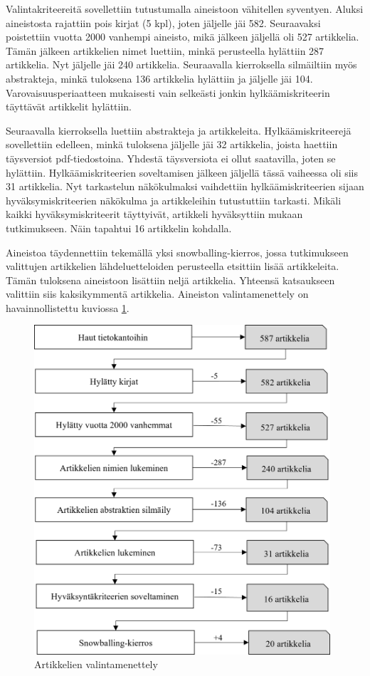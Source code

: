 \documentclass[utf8]{gradu3}
\begin{document}
Valintakriteereitä sovellettiin tutustumalla aineistoon vähitellen syventyen. Aluksi  aineistosta rajattiin pois kirjat (5 kpl), joten jäljelle jäi 582. Seuraavaksi poistettiin vuotta 2000 vanhempi aineisto, mikä jälkeen jäljellä oli 527 artikkelia. Tämän jälkeen artikkelien nimet luettiin, minkä perusteella hylättiin 287 artikkelia. Nyt jäljelle jäi 240 artikkelia. Seuraavalla kierroksella silmäiltiin myös abstrakteja, minkä tuloksena 136 artikkelia hylättiin ja jäljelle jäi 104. Varovaisuusperiaatteen mukaisesti vain selkeästi jonkin hylkäämiskriteerin täyttävät artikkelit hylättiin.

Seuraavalla kierroksella luettiin abstrakteja ja artikkeleita. Hylkäämiskriteerejä sovellettiin edelleen, minkä tuloksena jäljelle jäi 32 artikkelia, joista haettiin täysversiot pdf-tiedostoina. Yhdestä täysversiota ei ollut saatavilla, joten se hylättiin. Hylkäämiskriteerien soveltamisen jälkeen jäljellä tässä vaiheessa oli siis 31 artikkelia. Nyt tarkastelun näkökulmaksi vaihdettiin hylkäämiskriteerien sijaan hyväksymiskriteerien näkökulma ja artikkeleihin tutustuttiin tarkasti. Mikäli kaikki hyväksymiskriteerit täyttyivät, artikkeli hyväksyttiin mukaan tutkimukseen. Näin tapahtui 16 artikkelin kohdalla.

Aineistoa täydennettiin tekemällä yksi snowballing-kierros, jossa tutkimukseen valittujen artikkelien lähdeluetteloiden perusteella etsittiin lisää artikkeleita. Tämän tuloksena aineistoon lisättiin neljä artikkelia. Yhteensä katsaukseen valittiin siis kaksikymmentä artikkelia. Aineiston valintamenettely on havainnollistettu kuviossa \ref{kuvio:aineiston-rajaaminen-laaja}.

\begin{figure}[h]
    \centering
    \includegraphics[width=11cm]{media/aineiston-rajaaminen-laaja-vaakalinja.png}
    \caption{Artikkelien valintamenettely}
    \label{kuvio:aineiston-rajaaminen-laaja}
\end{figure}
\end{document}
